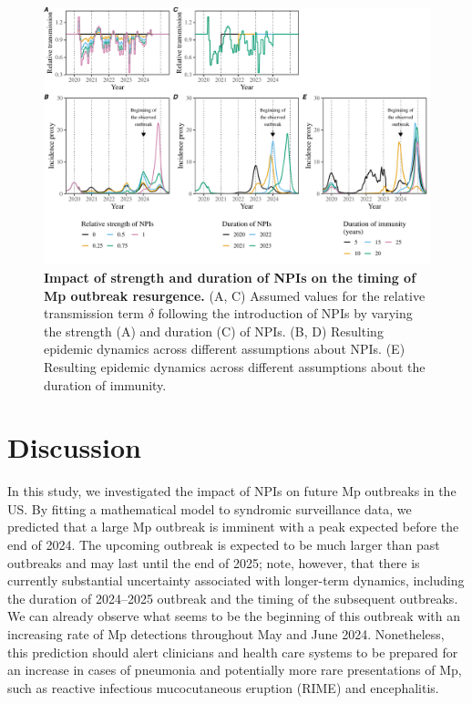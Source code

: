 \documentclass[12pt]{article}
\begin{document}
\begin{figure}[!th]
\includegraphics[width=\textwidth]{../figure3/figure3_new.pdf}
\caption{
\textbf{Impact of strength and duration of NPIs on the timing of Mp outbreak resurgence.}
(A, C) Assumed values for the relative transmission term $\delta$ following the introduction of NPIs by varying the strength (A) and duration (C) of NPIs.
(B, D) Resulting epidemic dynamics across different assumptions about NPIs.
(E) Resulting epidemic dynamics across different assumptions about the duration of immunity.
}
\end{figure}

\section{Discussion}

In this study, we investigated the impact of NPIs on future Mp outbreaks in the US.
By fitting a mathematical model to syndromic surveillance data, we predicted that a large Mp outbreak is imminent with a peak expected before the end of 2024.
The upcoming outbreak is expected to be much larger than past outbreaks and may last until the end of 2025; note, however, that there is currently substantial uncertainty associated with longer-term dynamics, including the duration of 2024--2025 outbreak and the timing of the subsequent outbreaks.
We can already observe what seems to be the beginning of this outbreak with an increasing rate of Mp detections throughout May and June 2024. 
Nonetheless, this prediction should alert clinicians and health care systems to be prepared for an increase in cases of pneumonia and potentially more rare presentations of Mp, such as reactive infectious mucocutaneous eruption (RIME) and encephalitis.
\end{document}
